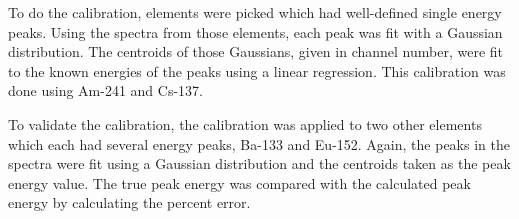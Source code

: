 To do the calibration, elements were picked which had well-defined single energy peaks. Using the spectra from those elements, each peak was fit with a Gaussian distribution. The centroids of those Gaussians, given in channel number, were fit to the known energies of the peaks using a linear regression. This calibration was done using Am-241 and Cs-137.

To validate the calibration, the calibration was applied to two other elements which each had several energy peaks, Ba-133 and Eu-152. Again, the peaks in the spectra were fit using a Gaussian distribution and the centroids taken as the peak energy value. The true peak energy was compared with the calculated peak energy by calculating the percent error.
